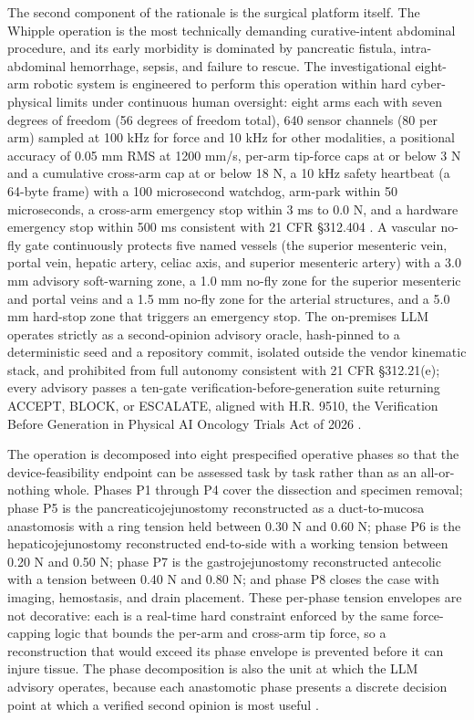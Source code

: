 The second component of the rationale is the surgical platform itself. The Whipple
operation is the most technically demanding curative-intent abdominal procedure, and
its early morbidity is dominated by pancreatic fistula, intra-abdominal hemorrhage,
sepsis, and failure to rescue. The investigational eight-arm robotic system is
engineered to perform this operation within hard cyber-physical limits under
continuous human oversight: eight arms each with seven degrees of freedom (56
degrees of freedom total), 640 sensor channels (80 per arm) sampled at 100 kHz for
force and 10 kHz for other modalities, a positional accuracy of 0.05 mm RMS at
1200 mm/s, per-arm tip-force caps at or below 3 N and a cumulative cross-arm cap at
or below 18 N, a 10 kHz safety heartbeat (a 64-byte frame) with a 100 microsecond
watchdog, arm-park within 50 microseconds, a cross-arm emergency stop within 3 ms to
0.0 N, and a hardware emergency stop within 500 ms consistent with 21 CFR
\S 312.404 \cite{onpremwhippl,daraxwhipple}. A vascular no-fly gate continuously
protects five named vessels (the superior mesenteric vein, portal vein, hepatic
artery, celiac axis, and superior mesenteric artery) with a 3.0 mm advisory
soft-warning zone, a 1.0 mm no-fly zone for the superior mesenteric and portal veins
and a 1.5 mm no-fly zone for the arterial structures, and a 5.0 mm hard-stop zone
that triggers an emergency stop. The on-premises LLM operates strictly as a
second-opinion advisory oracle, hash-pinned to a deterministic seed and a repository
commit, isolated outside the vendor kinematic stack, and prohibited from full
autonomy consistent with 21 CFR \S 312.21(e); every advisory passes a ten-gate
verification-before-generation suite returning ACCEPT, BLOCK, or ESCALATE, aligned
with H.R. 9510, the Verification Before Generation in Physical AI Oncology Trials
Act of 2026 \cite{congress9510,clintrustpai}.

The operation is decomposed into eight prespecified operative phases so that the
device-feasibility endpoint can be assessed task by task rather than as an
all-or-nothing whole. Phases P1 through P4 cover the dissection and specimen
removal; phase P5 is the pancreaticojejunostomy reconstructed as a duct-to-mucosa
anastomosis with a ring tension held between 0.30 N and 0.60 N; phase P6 is the
hepaticojejunostomy reconstructed end-to-side with a working tension between 0.20 N
and 0.50 N; phase P7 is the gastrojejunostomy reconstructed antecolic with a tension
between 0.40 N and 0.80 N; and phase P8 closes the case with imaging, hemostasis,
and drain placement. These per-phase tension envelopes are not decorative: each is a
real-time hard constraint enforced by the same force-capping logic that bounds the
per-arm and cross-arm tip force, so a reconstruction that would exceed its phase
envelope is prevented before it can injure tissue. The phase decomposition is also
the unit at which the LLM advisory operates, because each anastomotic phase presents
a discrete decision point at which a verified second opinion is most useful
\cite{onpremwhippl,daraxwhipple}.

